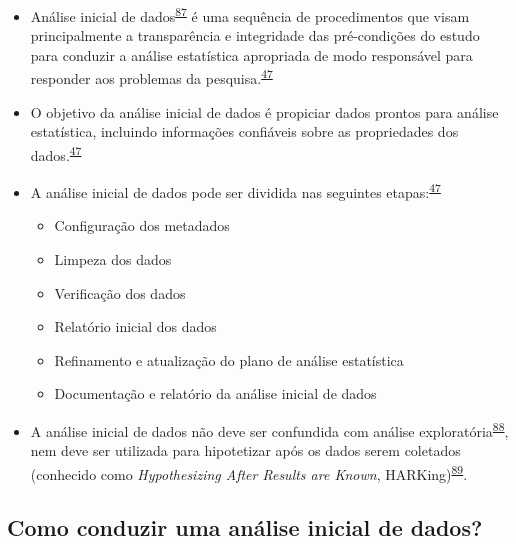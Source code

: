\documentclass[
  a4paper,
]{book}
\begin{document}
\begin{itemize}
\item
  Análise inicial de dados\textsuperscript{\protect\hyperlink{ref-chatfield1986}{87}} é uma sequência de procedimentos que visam principalmente a transparência e integridade das pré-condições do estudo para conduzir a análise estatística apropriada de modo responsável para responder aos problemas da pesquisa.\textsuperscript{\protect\hyperlink{ref-Baillie2022}{47}}
\item
  O objetivo da análise inicial de dados é propiciar dados prontos para análise estatística, incluindo informações confiáveis sobre as propriedades dos dados.\textsuperscript{\protect\hyperlink{ref-Baillie2022}{47}}
\item
  A análise inicial de dados pode ser dividida nas seguintes etapas:\textsuperscript{\protect\hyperlink{ref-Baillie2022}{47}}

  \begin{itemize}
  \item
    Configuração dos metadados
  \item
    Limpeza dos dados
  \item
    Verificação dos dados
  \item
    Relatório inicial dos dados
  \item
    Refinamento e atualização do plano de análise estatística
  \item
    Documentação e relatório da análise inicial de dados
  \end{itemize}
\item
  A análise inicial de dados não deve ser confundida com análise exploratória\textsuperscript{\protect\hyperlink{ref-Ferketich1986}{88}}, nem deve ser utilizada para hipotetizar após os dados serem coletados (conhecido como \emph{Hypothesizing After Results are Known}, HARKing)\textsuperscript{\protect\hyperlink{ref-Kerr1998}{89}}.
\end{itemize}

\hypertarget{como-conduzir-uma-anuxe1lise-inicial-de-dados}{%
\subsection{Como conduzir uma análise inicial de dados?}\label{como-conduzir-uma-anuxe1lise-inicial-de-dados}}
\end{document}
